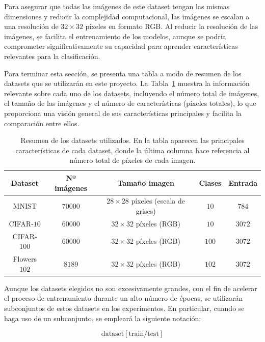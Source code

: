 Para asegurar que todas las imágenes de este dataset tengan las mismas dimensiones y reducir la complejidad computacional, las imágenes se escalan a una resolución de $32 \times 32$ píxeles en formato RGB. Al reducir la resolución de las imágenes, se facilita el entrenamiento de los modelos, aunque se podría comprometer significativamente su capacidad para aprender características relevantes para la clasificación.\newline

Para terminar esta sección, se presenta una tabla a modo de resumen de los datasets que se utilizarán en este proyecto. La Tabla~\ref{tab:datasets} muestra la información relevante sobre cada uno de los datasets, incluyendo el número total de imágenes, el tamaño de las imágenes y el número de características (píxeles totales), lo que proporciona una visión general de sus características principales y facilita la comparación entre ellos.\newline

\begin{table}[h]
    \centering
    \begin{tabular}{|c|c|c|c|c|}
    \hline
    \textbf{Dataset} & \textbf{Nº imágenes} & \textbf{Tamaño imagen} & \textbf{Clases} & \textbf{Entrada} \\
    \hline
    MNIST & $70000$ & $28 \times 28$ píxeles (escala de grises) & $10$ & $784$ \\
    CIFAR-$10$ & $60000$ & $32 \times 32$ píxeles (RGB) & $10$ & $3072$ \\
    CIFAR-$100$ & $60000$ & $32 \times 32$ píxeles (RGB) & $100$ & $3072$ \\
    Flowers$102$ & $8189$ & $32 \times 32$ píxeles (RGB) & $102$ & $3072$ \\
    \hline
    \end{tabular}
    \caption[Resumen de los datasets utilizados.]{Resumen de los datasets utilizados. En la tabla aparecen las principales características de cada dataset, donde la última columna hace referencia al número total de píxeles de cada imagen.}\label{tab:datasets}
\end{table}

Aunque los datasets elegidos no son excesivamente grandes, con el fin de acelerar el proceso de entrenamiento durante un alto número de épocas, se utilizarán subconjuntos de estos datasets en los experimentos. En particular, cuando se haga uso de un subconjunto, se empleará la siguiente notación:

\[
    \text{dataset}[\text{train/test}]
\]

